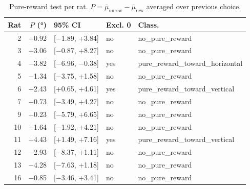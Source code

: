 \begin{table}[htbp]
  \centering
  \caption{Pure-reward test per rat. $P = \bar\mu_{\mathrm{unrew}} - \bar\mu_{\mathrm{rew}}$ averaged over previous choice.}
  \label{tab:pure_reward}
  \begin{tabular}{rrlll}
    \toprule
    Rat & $P$ (°) & 95\% CI & Excl. 0 & Class. \\
    \midrule
    2 & +0.92 & [−1.89, +3.84] & no & no\_pure\_reward \\
    3 & +3.06 & [−0.87, +8.27] & no & no\_pure\_reward \\
    4 & −3.82 & [−6.96, −0.38] & yes & pure\_reward\_toward\_horizontal \\
    5 & −1.34 & [−3.75, +1.58] & no & no\_pure\_reward \\
    6 & +2.43 & [+0.65, +4.61] & yes & pure\_reward\_toward\_vertical \\
    7 & +0.73 & [−3.49, +4.27] & no & no\_pure\_reward \\
    9 & +0.23 & [−5.79, +6.65] & no & no\_pure\_reward \\
    10 & +1.64 & [−1.92, +4.21] & no & no\_pure\_reward \\
    11 & +4.43 & [+1.49, +7.16] & yes & pure\_reward\_toward\_vertical \\
    12 & −2.93 & [−8.37, +1.11] & no & no\_pure\_reward \\
    13 & −4.28 & [−7.63, +1.18] & no & no\_pure\_reward \\
    16 & −0.85 & [−3.46, +3.41] & no & no\_pure\_reward \\
    \bottomrule
  \end{tabular}
\end{table}
